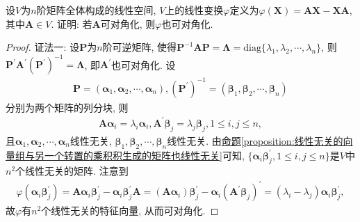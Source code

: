 \documentclass[../../main.tex]{subfiles}
\begin{document}
\begin{example}
设\(V\)为\(n\)阶矩阵全体构成的线性空间, \(V\)上的线性变换\(\varphi\)定义为\(\varphi(\boldsymbol{X})=\boldsymbol{A}\boldsymbol{X}-\boldsymbol{X}\boldsymbol{A}\), 其中\(\boldsymbol{A}\in V\). 证明: 若\(\boldsymbol{A}\)可对角化, 则\(\varphi\)也可对角化.
\end{example}
\begin{proof}
{\color{blue}证法一:}
设\(\boldsymbol{P}\)为\(n\)阶可逆矩阵, 使得\(\boldsymbol{P}^{-1}\boldsymbol{AP}=\boldsymbol{\Lambda}=\mathrm{diag}\{\lambda_{1},\lambda_{2},\cdots,\lambda_{n}\}\), 则\(\boldsymbol{P}^{\prime}\boldsymbol{A}^{\prime}(\boldsymbol{P}^{\prime})^{-1}=\boldsymbol{\Lambda}\), 即\(\boldsymbol{A}^{\prime}\)也可对角化. 设
\begin{align*}
\boldsymbol{P}=(\boldsymbol{\alpha}_{1},\boldsymbol{\alpha}_{2},\cdots,\boldsymbol{\alpha}_{n}), (\boldsymbol{P}^{\prime})^{-1}=(\boldsymbol{\beta}_{1},\boldsymbol{\beta}_{2},\cdots,\boldsymbol{\beta}_{n})
\end{align*}
分别为两个矩阵的列分块, 则
\begin{align*}
\boldsymbol{A}\boldsymbol{\alpha}_{i}=\lambda_{i}\boldsymbol{\alpha}_{i}, \boldsymbol{A}^{\prime}\boldsymbol{\beta}_{j}=\lambda_{j}\boldsymbol{\beta}_{j}, 1\leq i,j\leq n,
\end{align*}
且\(\boldsymbol{\alpha}_{1},\boldsymbol{\alpha}_{2},\cdots,\boldsymbol{\alpha}_{n}\)线性无关, \(\boldsymbol{\beta}_{1},\boldsymbol{\beta}_{2},\cdots,\boldsymbol{\beta}_{n}\)线性无关. 由\hyperref[proposition:线性无关的向量组与另一个转置的乘积积生成的矩阵也线性无关]{命题\ref{proposition:线性无关的向量组与另一个转置的乘积积生成的矩阵也线性无关}}可知, \(\{\boldsymbol{\alpha}_{i}\boldsymbol{\beta}_{j}^{\prime},1\leq i,j\leq n\}\)是\(V\)中\(n^{2}\)个线性无关的矩阵. 注意到
\begin{align*}
\varphi(\boldsymbol{\alpha}_{i}\boldsymbol{\beta}_{j}^{\prime})=\boldsymbol{A}\boldsymbol{\alpha}_{i}\boldsymbol{\beta}_{j}^{\prime}-\boldsymbol{\alpha}_{i}\boldsymbol{\beta}_{j}^{\prime}\boldsymbol{A}=(\boldsymbol{A}\boldsymbol{\alpha}_{i})\boldsymbol{\beta}_{j}^{\prime}-\boldsymbol{\alpha}_{i}(\boldsymbol{A}^{\prime}\boldsymbol{\beta}_{j})^{\prime}=(\lambda_{i}-\lambda_{j})\boldsymbol{\alpha}_{i}\boldsymbol{\beta}_{j}^{\prime},
\end{align*}
故\(\varphi\)有\(n^{2}\)个线性无关的特征向量, 从而可对角化.


\end{proof}
\end{document}
